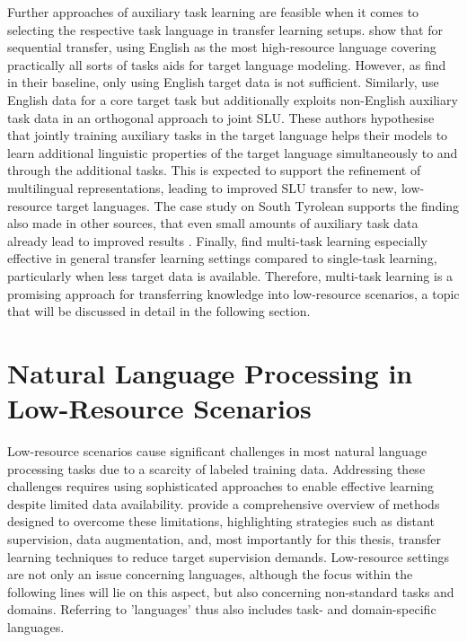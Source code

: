 \documentclass[11pt,a4paper,twoside,openright]{scrbook}
\begin{document}
Further approaches of auxiliary task learning are feasible when it comes to selecting the respective task language in transfer learning setups. \citet{phang-etal-2020-english} show that for sequential transfer, using English as the most high-resource language covering practically all sorts of tasks aids for target language modeling. However, as \citet{jhan-etal-2022-c5l7} find in their baseline, only using English target data is not sufficient. Similarly, \citet{van-der-goot-etal-2021-masked} use English data for a core target task but additionally exploits non-English auxiliary task data in an orthogonal approach to joint SLU. These authors hypothesise that jointly training auxiliary tasks in the target language helps their models to learn additional linguistic properties of the target language simultaneously to and through the additional tasks. This is expected to support the refinement of multilingual representations, leading to improved SLU transfer to new, low-resource target languages. The case study on South Tyrolean supports the finding also made in other sources, that even small amounts of auxiliary task data already lead to improved results \citet{van-der-goot-etal-2021-masked, muller-etal-2021-unseen}. Finally, \citet{louvan-magnini-2020-recent} find multi-task learning especially effective in general transfer learning settings compared to single-task learning, particularly when less target data is available. Therefore, multi-task learning is a promising approach for transferring knowledge into low-resource scenarios, a topic that will be discussed in detail in the following section.







\section{Natural Language Processing in Low-Resource Scenarios}

Low-resource scenarios cause significant challenges in most natural language processing tasks due to a scarcity of labeled training data. Addressing these challenges requires using sophisticated approaches to enable effective learning despite limited data availability. \citet{hedderich-etal-2021-survey} provide a comprehensive overview of methods designed to overcome these limitations, highlighting strategies such as distant supervision, data augmentation, and, most importantly for this thesis, transfer learning techniques to reduce target supervision demands. Low-resource settings are not only an issue concerning languages, although the focus within the following lines will lie on this aspect, but also concerning non-standard tasks and domains. Referring to 'languages' thus also includes task- and domain-specific languages. 
\end{document}
